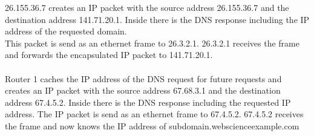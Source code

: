 \documentclass{WeSTassignment}
\begin{document}
26.155.36.7 creates an IP packet with the source address 26.155.36.7 and the destination address 141.71.20.1. Inside there is the DNS response including the IP address of the requested domain.\\
 This packet is send as an ethernet frame to 26.3.2.1. 26.3.2.1 receives the frame and forwards the encapsulated IP packet to 141.71.20.1.\\
\\
Router 1 caches the IP address of the DNS request for future requests and creates an IP packet with the source address 67.68.3.1 and the destination address 67.4.5.2. Inside there is the DNS response including the requested IP address. The IP packet is send as an ethernet frame to 67.4.5.2. 67.4.5.2 receives the frame and now knows the IP address of subdomain.webscienceexample.com









\makefooter
\end{document}
